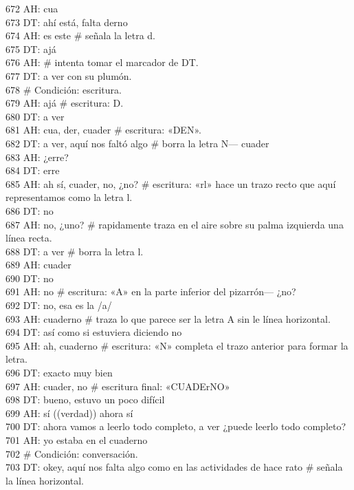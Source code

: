 672 AH: cua\\
673 DT: ahí está, falta derno\\
674 AH: es este \# señala la letra d.\\
675 DT: ajá\\
676 AH: \# intenta tomar el marcador de DT.\\
677 DT: a ver con su plumón.\\
678 \# Condición: escritura.\\
679 AH: ajá \# escritura: D.\\
680 DT: a ver\\
681 AH: cua, der, cuader \# escritura: «DEN».\\
682 DT: a ver, aquí nos faltó algo \# borra la letra N--- cuader\\
683 AH: ¿erre?\\
684 DT: erre\\
685 AH: ah sí, cuader, no, ¿no? \# escritura: «rl» hace un trazo recto que aquí representamos como la letra l.\\
686 DT: no\\
687 AH: no, ¿uno? \# rapidamente traza en el aire sobre su palma izquierda una línea recta.\\
688 DT: a ver \# borra la letra l.\\
689 AH: cuader\\
690 DT: no\\
691 AH: no \# escritura: «A» en la parte inferior del pizarrón--- ¿no?\\
692 DT: no, esa es la /a/\\
693 AH: cuaderno \# traza lo que parece ser la letra A sin le línea horizontal.\\
694 DT: así como si estuviera diciendo no\\
695 AH: ah, cuaderno \# escritura: «N» completa el trazo anterior para formar la letra.\\
696 DT: exacto muy bien\\
697 AH: cuader, no \# escritura final: «CUADErNO»\\
698 DT: bueno, estuvo un poco difícil\\
699 AH: sí ((verdad)) ahora sí\\
700 DT: ahora vamos a leerlo todo completo, a ver ¿puede leerlo todo completo?\\
701 AH: yo estaba en el cuaderno\\
702 \# Condición: conversación.\\
703 DT: okey, aquí nos falta algo como en las actividades de hace rato \# señala la línea horizontal.\\
